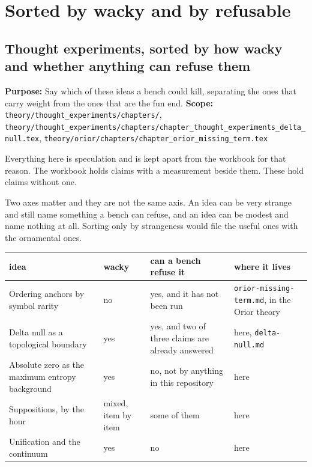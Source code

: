 \chapter{Sorted by wacky and by refusable}

\section{Thought experiments, sorted by how wacky and whether anything can refuse them}

\textbf{Purpose:} Say which of these ideas a bench could kill, separating the ones that carry weight from the ones that are the fun end. \textbf{Scope:} \texttt{theory/\allowbreak{}thought\_\allowbreak{}experiments/\allowbreak{}chapters/\allowbreak{}}, \texttt{theory/\allowbreak{}thought\_\allowbreak{}experiments/\allowbreak{}chapters/\allowbreak{}chapter\_\allowbreak{}thought\_\allowbreak{}experiments\_\allowbreak{}delta\_\allowbreak{}null.\allowbreak{}tex}, \texttt{theory/\allowbreak{}orior/\allowbreak{}chapters/\allowbreak{}chapter\_\allowbreak{}orior\_\allowbreak{}missing\_\allowbreak{}term.\allowbreak{}tex}

Everything here is speculation and is kept apart from the workbook for that reason. The workbook holds claims with a measurement beside them. These hold claims without one.

Two axes matter and they are not the same axis. An idea can be very strange and still name something a bench can refuse, and an idea can be modest and name nothing at all. Sorting only by strangeness would file the useful ones with the ornamental ones.

\tiny
\setlength{\tabcolsep}{2pt}
\begin{longtable}{@{}>{\raggedright\arraybackslash}p{}>{\raggedright\arraybackslash}p{}>{\raggedright\arraybackslash}p{}>{\raggedright\arraybackslash}p{}@{}}
\toprule
idea & wacky & can a bench refuse it & where it lives \\
\midrule
Ordering anchors by symbol rarity & no & yes, and it has not been run & \texttt{orior-\allowbreak{}missing-\allowbreak{}term.\allowbreak{}md}, in the Orior theory \\
Delta null as a topological boundary & yes & yes, and two of three claims are already answered & here, \texttt{delta-\allowbreak{}null.\allowbreak{}md} \\
Absolute zero as the maximum entropy background & yes & no, not by anything in this repository & here \\
Suppositions, by the hour & mixed, item by item & some of them & here \\
Unification and the continuum & yes & no & here \\
\bottomrule
\end{longtable}
\normalsize

